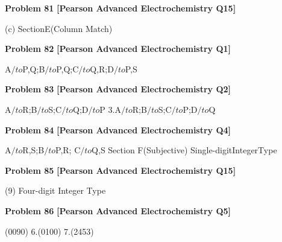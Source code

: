 \begin{problembox}
\textbf{Problem 81} \hfill \textbf{[Pearson Advanced Electrochemistry Q15]}
\label{q:ext-pearson-81}

(c)
SectionE(Column Match)
\end{problembox}

\begin{problembox}
\textbf{Problem 82} \hfill \textbf{[Pearson Advanced Electrochemistry Q1]}
\label{q:ext-pearson-82}

A$/to$P,Q;B$/to$P,Q;C$/to$Q,R;D$/to$P,S
\end{problembox}

\begin{problembox}
\textbf{Problem 83} \hfill \textbf{[Pearson Advanced Electrochemistry Q2]}
\label{q:ext-pearson-83}

A$/to$R;B$/to$S;C$/to$Q;D$/to$P
3.A$/to$R;B$/to$S;C$/to$P;D$/to$Q
\end{problembox}

\begin{problembox}
\textbf{Problem 84} \hfill \textbf{[Pearson Advanced Electrochemistry Q4]}
\label{q:ext-pearson-84}

A$/to$R,S;B$/to$P,R; C$/to$Q,S
Section F(Subjective)
Single-digitIntegerType
\end{problembox}

\begin{problembox}
\textbf{Problem 85} \hfill \textbf{[Pearson Advanced Electrochemistry Q15]}
\label{q:ext-pearson-85}

(9)
Four-digit Integer Type
\end{problembox}

\begin{problembox}
\textbf{Problem 86} \hfill \textbf{[Pearson Advanced Electrochemistry Q5]}
\label{q:ext-pearson-86}

(0090)
6.(0100)
7.(2453)
\end{problembox}